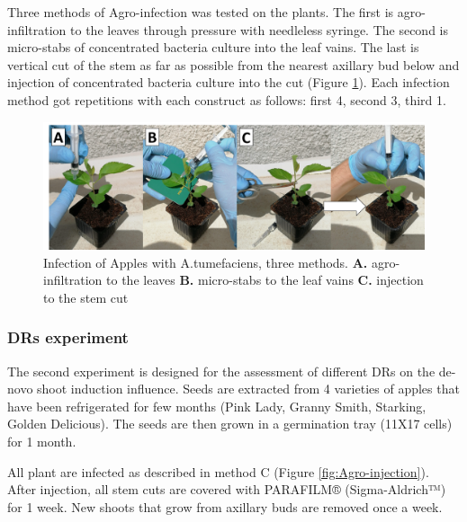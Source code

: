\documentclass[
]{article}
\begin{document}
Three methods of Agro-infection was tested on the plants. The first is
agro-infiltration to the leaves through pressure with needleless
syringe. The second is micro-stabs of concentrated bacteria culture into
the leaf vains. The last is vertical cut of the stem as far as possible
from the nearest axillary bud below and injection of concentrated
bacteria culture into the cut (Figure \ref{fig:Agro-infection methods}).
Each infection method got repetitions with each construct as follows:
first 4, second 3, third 1.

\begin{figure}[h]

{\centering \includegraphics[width=1\linewidth]{apple injection3} 

}

\caption{Infection of Apples with A.tumefaciens, three methods. \newline{} \textbf{A.} agro-infiltration to the leaves \textbf{B.} micro-stabs to the leaf vains \textbf{C.} injection to the stem cut}\label{fig:Agro-infection methods}
\end{figure}

\hypertarget{drs-experiment}{%
\subsubsection{DRs experiment}\label{drs-experiment}}

The second experiment is designed for the assessment of different DRs on
the de-novo shoot induction influence. Seeds are extracted from 4
varieties of apples that have been refrigerated for few months (Pink
Lady, Granny Smith, Starking, Golden Delicious). The seeds are then
grown in a germination tray (11X17 cells) for 1 month.

All plant are infected as described in method C (Figure
\ref{fig:Agro-injection}). After injection, all stem cuts are covered
with PARAFILM® (Sigma-Aldrich™) for 1 week. New shoots that grow from
axillary buds are removed once a week.
\end{document}
